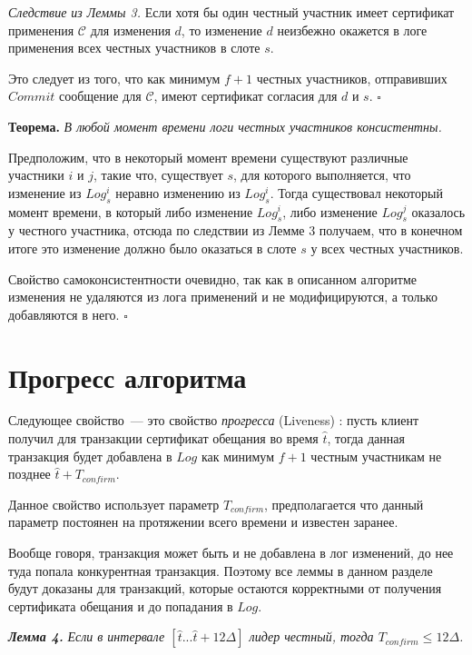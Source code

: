 \textit{Следствие из Леммы 3.} Если хотя бы один честный участник имеет сертификат применения $\mathcal{C}$ для изменения $d$, то  изменение $d$ неизбежно окажется в логе применения всех честных участников в слоте $s$. 

Это следует из того, что как минимум $f+1$ честных участников, отправивших $Commit$ сообщение для $\mathcal{C}$, имеют сертификат согласия для $d$ и $s$. $\square$
\vspace{10pt}

\textbf{Теорема.} \textit{В любой момент времени логи честных участников консистентны.}

Предположим, что в некоторый момент времени существуют различные участники $i$ и $j$, такие что, существует $s$, для которого выполняется, что изменение из $Log^i_s$ неравно изменению из $Log^i_s$. Тогда существовал некоторый момент времени, в который либо изменение $Log^i_s$, либо изменение $Log^j_s$ оказалось у честного участника, отсюда по следствии из Лемме 3 получаем, что в конечном итоге это изменение должно было оказаться в слоте $s$ у всех честных участников.

Свойство самоконсистентности очевидно, так как в описанном алгоритме изменения не удаляются из лога применений и не модифицируются, а только добавляются в него. $\square$

\section{Прогресс алгоритма}
\noindent Следующее свойство~--- это свойство \textit{прогресса} (Liveness) \cite{hybrid-consensus}:
пусть клиент получил для транзакции сертификат обещания во время $\hat{t}$, тогда данная транзакция будет добавлена в $Log$ как минимум $f+1$ честным участникам не позднее $\hat{t} + T_{confirm}$.

Данное свойство использует параметр $T_{confirm}$, предполагается что данный параметр постоянен на протяжении всего времени и известен заранее.

Вообще говоря, транзакция может быть и не добавлена в лог изменений, до нее туда попала конкурентная транзакция. Поэтому все леммы в данном разделе будут доказаны для транзакций, которые остаются корректными от получения сертификата обещания и до попадания в $Log$.
\vspace{10pt}

\textbf{\textit{Лемма 4.}} \textit{Если в интервале $[\hat{t}...\hat{t}+12\Delta]$ лидер честный, тогда $T_{confirm} \le 12\Delta$.}

